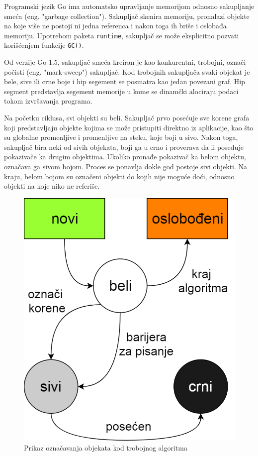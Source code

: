 \documentclass[12pt,oneside]{memoir}
\begin{document}
Programski jezik Go ima automatsko upravljanje memorijom odnosno sakupljanje smeća (eng. "garbage collection"). Sakupljač skenira memoriju, pronalazi objekte na koje više ne postoji ni jedna referenca i nakon toga ih briše i oslobađa memoriju. Upotrebom paketa \texttt{runtime},  sakupljač se može eksplicitno pozvati korišćenjem funkcije \texttt{GC()}. 

Od verzije Go 1.5,  sakupljač smeća \cite{garbage} kreiran je kao konkurentni, trobojni, označi-počisti (eng. "mark-sweep") sakupljač. Kod trobojnih sakupljača svaki objekat je bele, sive ili crne boje i hip segement se posmatra kao jedan povezani graf. Hip segment predstavlja segement memorije u kome se dinamčki alociraju podaci tokom izvršavanja programa.

Na početku ciklusa, svi objekti su beli. Sakupljač prvo posećuje sve korene grafa koji predstavljaju objekte kojima se može pristupiti direktno iz aplikacije, kao što su globalne promenljive i promenljive na steku, koje boji u sivo. Nakon toga, sakupljač bira neki od sivih objekata, boji ga u crno i proverava da li poseduje pokazivače ka drugim objektima. Ukoliko pronađe pokazivač ka belom objektu, označava ga sivom bojom. Proces se ponavlja dokle god postoje sivi objekti. Na kraju, belom bojom su označeni objekti do kojih nije moguće doći, odnosno objekti na koje niko ne referiše.

\begin{figure}
\begin{center}
\includegraphics[scale=0.33]{tricolor.png}
\end{center}
\caption{Prikaz označavanja objekata kod trobojnog algoritma}
\label{fig:tricolor}
\end{figure}
\end{document}
